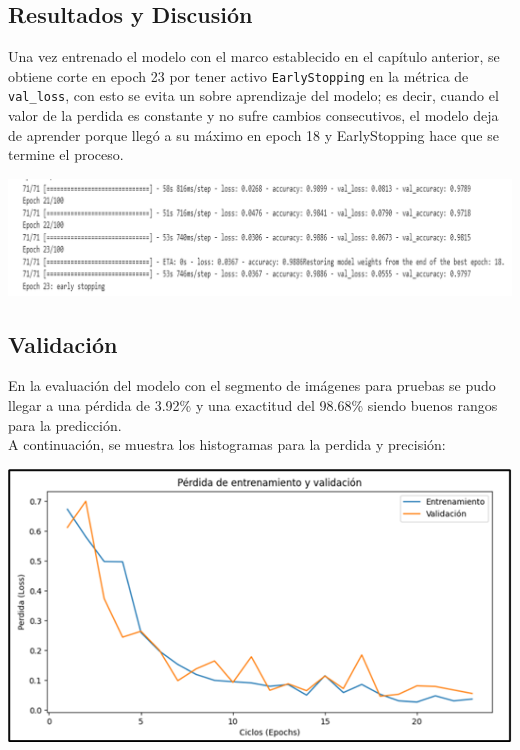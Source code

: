 \documentclass[12pt,twoside,titlepage]{ingenius}
\newenvironment{figura}
  {\par\bigskip\noindent\minipage{\linewidth}}
  {\endminipage\par\bigskip}
\begin{document}
\begin{multicols}{2}
\section{Resultados y Discusión}


Una vez entrenado el modelo con el marco establecido en el capítulo anterior, se obtiene corte en epoch 23 por tener activo \texttt{EarlyStopping} en la métrica de \texttt{val\_loss}, con esto se evita un sobre aprendizaje del modelo; es decir, cuando el valor de la perdida es constante y no sufre cambios consecutivos, el modelo deja de aprender porque llegó a su máximo en epoch 18 y EarlyStopping hace que se termine el proceso. 

\begin{figura}%
\centering
\includegraphics[scale=0.22]{figuras/fig9.png}
\label{figura9}
\end{figura}

\subsection{Validación}
En la evaluación del modelo con el segmento de imágenes para pruebas se pudo llegar a una pérdida de 3.92\% y una exactitud del 98.68\% siendo buenos rangos para la predicción.\\
A continuación, se muestra los histogramas para la perdida y precisión:

\begin{figura}%
	\centering
	\includegraphics[scale=0.5]{figuras/fig10.png}
	\label{figura10}
\end{figura}


\end{multicols}
\end{document}
